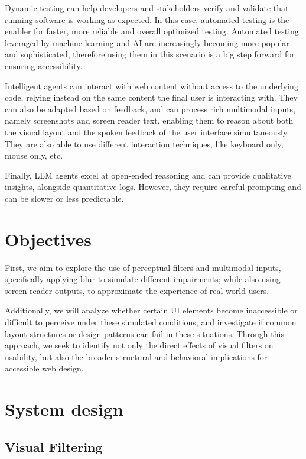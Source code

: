 Dynamic testing can help developers and stakeholders verify and validate that running software is working as expected\cite{vasquez2018continuous}. In this case, automated testing is the enabler for faster, more reliable and overall optimized testing. Automated testing leveraged by machine learning and \ac{AI} are increasingly becoming more popular and sophisticated, therefore using them in this scenario is a big step forward for ensuring accessibility.

Intelligent agents can interact with web content without access to the underlying code, relying instead on the same content the final user is interacting with\cite{lanham2025ai, wang2024survey, lu2025uxagent}. They can also be adapted based on feedback, and can process rich multimodal inputs, namely screenshots and screen reader text, enabling them to reason about both the visual layout and the spoken feedback of the user interface simultaneously. They are also able to use different interaction techniques, like keyboard only, mouse only, etc. 

Finally, LLM agents excel at open-ended reasoning and can provide qualitative insights, alongside quantitative logs. However, they require careful prompting and can be slower or less predictable.
\vspace{-8pt}

\section{Objectives}

First, we aim to explore the use of perceptual filters and multimodal inputs, specifically applying blur to simulate different impairments; while also using screen reader outputs, to approximate the experience of real world users. 

Additionally, we will analyze whether certain \ac{UI} elements become inaccessible or difficult to perceive under these simulated conditions, and investigate if common layout structures or design patterns can fail in these situations. Through this approach, we seek to identify not only the direct effects of visual filters on usability, but also the broader structural and behavioral implications for accessible web design.

\section{System design}
\subsection{Visual Filtering}

